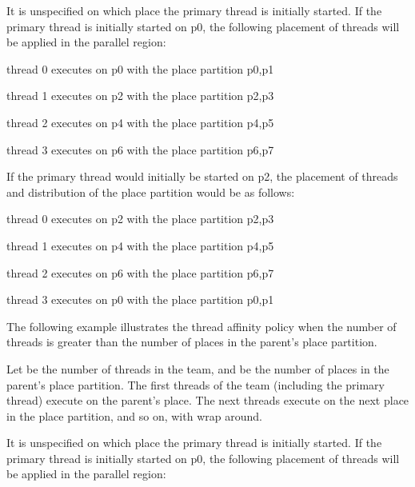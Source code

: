 It is unspecified on which place the primary thread is initially started. If the 
primary thread is initially started on p0, the following placement of threads will 
be applied in the parallel region:

\begin{compactitem}
\item thread 0 executes on p0 with the place partition p0,p1

\item thread 1 executes on p2 with the place partition p2,p3

\item thread 2 executes on p4 with the place partition p4,p5

\item thread 3 executes on p6 with the place partition p6,p7
\end{compactitem}


If the primary thread would initially be started on p2, the placement of threads 
and distribution of the place partition would be as follows:

\begin{compactitem}
\item thread 0 executes on p2 with the place partition p2,p3

\item thread 1 executes on p4 with the place partition p4,p5

\item thread 2 executes on p6 with the place partition p6,p7

\item thread 3 executes on p0 with the place partition p0,p1
\end{compactitem}

The following example illustrates the  thread affinity policy when 
the number of threads is greater than the number of places in the parent's place 
partition.

Let  be the number of threads in the team, and  be the number of places in the 
parent's place partition. The first  threads of the team (including the primary
thread) execute on the parent's place. The next  threads execute on the next 
place in the place partition, and so on, with wrap around. 



It is unspecified on which place the primary thread is initially started. If the 
primary thread is initially started on p0, the following placement of threads will 
be applied in the parallel region:

